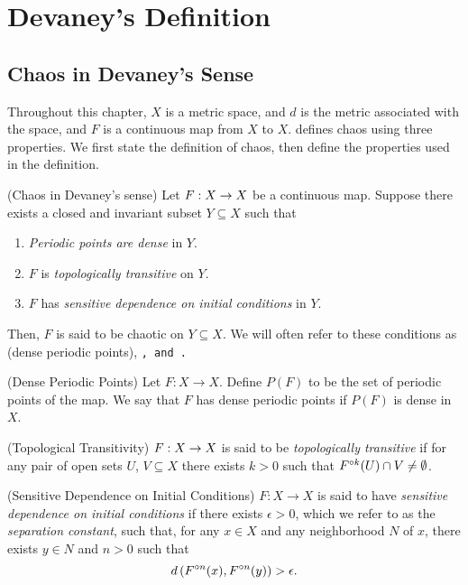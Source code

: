 \documentclass[12pt,draft,twoside]{book}
\begin{document}
\chapter{Devaney's Definition}
\label{chap:devaney}
\section{Chaos in Devaney's Sense}
Throughout this chapter, $X$ is a metric space, and $d$ is the metric associated with the space, and $F$ is a continuous map from $X$ to $X$.
\citet{devaney} defines chaos using three properties.
We first state the definition of chaos, then define the properties used in the definition.
\begin{definition}
  (Chaos in Devaney's sense) 
  Let $F: X\rightarrow X$ be a continuous map.
  Suppose there exists a closed and invariant subset $Y \subseteq X$ such that
  \begin{enumerate}
    \item \textit{Periodic points are dense} in $Y$.
    \item $F$ is \textit{topologically transitive} on $Y$.
    \item $F$ has \textit{sensitive dependence on initial conditions} in $Y$.
  \end{enumerate}
  Then, $F$ is said to be chaotic on $Y \subseteq X$.
  We will often refer to these conditions as \dpp (dense periodic points), \tt, and \sdic.
\end{definition}
%
\begin{definition}
  (Dense Periodic Points) 
  Let $F: X \to X$.
  Define $P(F)$ to be the set of periodic points of the map.
  We say that $F$ has dense periodic points if $P(F)$ is dense in $X$.
\end{definition}
%
\begin{definition}
  (Topological Transitivity) 
  $F: X \rightarrow X$ is said to be \textit{topologically transitive} if for any pair of open sets $U$, $V \subseteq X$ there exists $k > 0$ such that $F^{\circ k}(U) \cap V \neq \emptyset$.
  \label{defn:transitivity}
   \end{definition}
%
\begin{definition}
  (Sensitive Dependence on Initial Conditions) 
  $F: X \rightarrow X$ is said to have \textit{sensitive dependence on initial conditions} if there exists $\epsilon > 0$, which we refer to as the \textit{separation constant}, such that, for any $x \in X$ and any neighborhood $N$ of $x$, there exists $y\in N$ and $n > 0$ such that 
  \begin{equation*}
    d\left( F^{\circ n}(x), F^{\circ n}(y) \right) > \epsilon.
  \end{equation*}
  \label{defn:sdic}
\end{definition}
\end{document}
